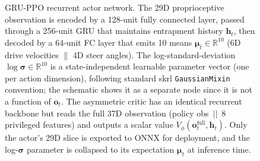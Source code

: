 \documentclass[conference]{IEEEtran}
\begin{document}
\begin{figure}[!htbp]
{%
  }
  \caption{GRU-PPO recurrent actor network. The 29D proprioceptive observation is
    encoded by a 128-unit fully connected layer, passed through a 256-unit GRU that
    maintains entrapment history $\mathbf{h}_t$, then decoded by a 64-unit FC layer
    that emits 10 means $\boldsymbol{\mu}_t \in \mathbb{R}^{10}$ (6D drive
    velocities $\|$ 4D steer angles). The log-standard-deviation
    $\log\boldsymbol{\sigma} \in \mathbb{R}^{10}$ is a state-independent
    learnable parameter vector (one per action dimension), following standard
    skrl \texttt{GaussianMixin} convention; the schematic shows it as a
    separate node since it is not a function of $\mathbf{o}_t$. The
    asymmetric critic has an identical recurrent backbone but reads the full
    37D observation (policy obs~$||$~8 privileged features) and outputs a
    scalar value $V_\phi(\mathbf{o}_t^{\text{full}}, \mathbf{h}_t)$. Only the
    actor's 29D slice is exported to ONNX for deployment, and the
    log-$\boldsymbol{\sigma}$ parameter is collapsed to its expectation
    $\boldsymbol{\mu}_t$ at inference time.}
  \label{fig:policy_arch}
\end{figure}

\end{document}
